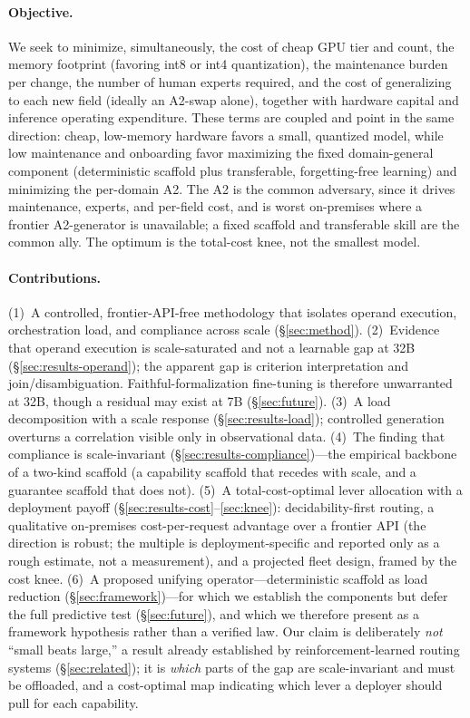 \paragraph{Objective.}%
We seek to minimize, simultaneously, the cost of cheap GPU tier and count, the memory footprint (favoring int8 or int4 quantization), the maintenance burden per change, the number of human experts required, and the cost of generalizing to each new field (ideally an A2-swap alone), together with hardware capital and inference operating expenditure. These terms are coupled and point in the same direction: cheap, low-memory hardware favors a small, quantized model, while low maintenance and onboarding favor maximizing the fixed domain-general component (deterministic scaffold plus transferable, forgetting-free learning) and minimizing the per-domain A2. The A2 is the common adversary, since it drives maintenance, experts, and per-field cost, and is worst on-premises where a frontier A2-generator is unavailable; a fixed scaffold and transferable skill are the common ally. The optimum is the total-cost knee, not the smallest model.

\paragraph{Contributions.}%
(1)~A controlled, frontier-API-free methodology that isolates operand execution, orchestration load, and compliance across scale (\S\ref{sec:method}).
(2)~Evidence that operand execution is scale-saturated and not a learnable gap at 32B (\S\ref{sec:results-operand}); the apparent gap is criterion interpretation and join/disambiguation. Faithful-formalization fine-tuning is therefore unwarranted at 32B, though a residual may exist at 7B (\S\ref{sec:future}).
(3)~A load decomposition with a scale response (\S\ref{sec:results-load}); controlled generation overturns a correlation visible only in observational data.
(4)~The finding that compliance is scale-invariant (\S\ref{sec:results-compliance})---the empirical backbone of a two-kind scaffold (a capability scaffold that recedes with scale, and a guarantee scaffold that does not).
(5)~A total-cost-optimal lever allocation with a deployment payoff (\S\ref{sec:results-cost}--\ref{sec:knee}): decidability-first routing, a qualitative on-premises cost-per-request advantage over a frontier API (the direction is robust; the multiple is deployment-specific and reported only as a rough estimate, not a measurement), and a projected fleet design, framed by the cost knee.
(6)~A proposed unifying operator---deterministic scaffold as load reduction (\S\ref{sec:framework})---for which we establish the components but defer the full predictive test (\S\ref{sec:future}), and which we therefore present as a framework hypothesis rather than a verified law.
Our claim is deliberately \emph{not} ``small beats large,'' a result already established by reinforcement-learned routing systems (\S\ref{sec:related}); it is \emph{which} parts of the gap are scale-invariant and must be offloaded, and a cost-optimal map indicating which lever a deployer should pull for each capability.

